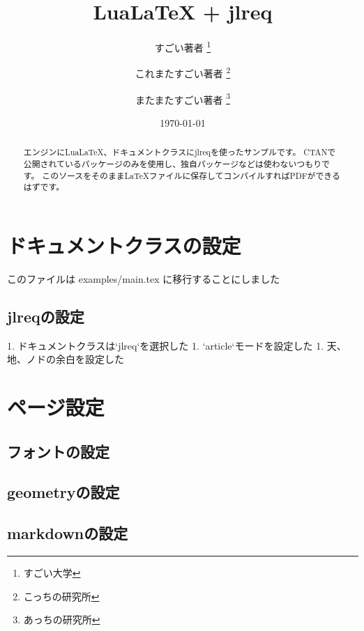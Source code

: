 \documentclass[
    article,
    head_space=25truemm,
    foot_space=10truemm,
    gutter=15truemm]{jlreq}
\title{LuaLaTeX + jlreq}
\author{
    すごい著者 \thanks{すごい大学} \\ \and
    これまたすごい著者 \thanks{こっちの研究所} \\ \and
    またまたすごい著者 \thanks{あっちの研究所}
}
\date{\today}
\begin{document}
\maketitle

\begin{abstract}
エンジンにLuaLaTeX、ドキュメントクラスにjlreqを使ったサンプルです。
CTANで公開されているパッケージのみを使用し、独自パッケージなどは使わないつもりです。
このソースをそのままLaTeXファイルに保存してコンパイルすればPDFができるはずです。
\end{abstract}

\tableofcontents

\section{ドキュメントクラスの設定}

このファイルは examples/main.tex に移行することにしました


\subsection{jlreqの設定}


\begin{markdown}
1. ドキュメントクラスは`jlreq`を選択した
1. `article`モードを設定した
1. 天、地、ノドの余白を設定した
\end{markdown}


\section{ページ設定}

\subsection{フォントの設定}

\subsection{geometryの設定}

\subsection{markdownの設定}
\end{document}
